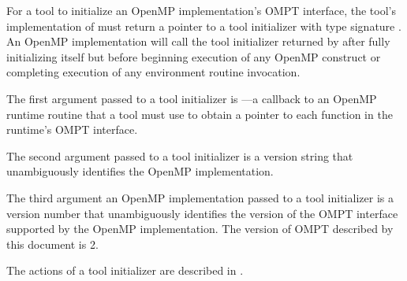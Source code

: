 \descr
For a tool to initialize an OpenMP implementation's OMPT interface,
the tool's implementation of  must return a 
pointer to a tool initializer with type signature .
An OpenMP implementation will call the tool initializer returned by
 after fully initializing itself but before 
beginning execution of any OpenMP construct
or completing execution of any environment routine invocation.  

\argdesc
The first argument passed to a tool initializer 
is ---a callback 
to an OpenMP runtime routine that a tool must use to 
obtain a pointer to each function in the runtime's OMPT interface.

\begin{comment}
All functions in the OMPT interface are marked with \code{OMPT\_API}, which
indicates that the only way a tool can obtain bindings for them
is using the \plc{lookup} callback.

The \code{lookup} callback is necessary in the case when an OpenMP runtime 
is dynamically loaded by a shared library. In this case, 
OMPT interface functions provided by the library may 
not be visible to a preloaded tool.
\end{comment}

The second argument passed to a tool initializer 
is a version string that unambiguously identifies the OpenMP implementation.

\begin{comment}
This argument is useful to tool developers trying to debug a statically-linked executable that contains both a tool implementation and an OpenMP implementation.
Knowing exactly what version of an OpenMP implementation is present 
may be helpful when diagnosing a problem, e.g., identifying an old runtime system that may be incompatible with a newer tool.
\end{comment}

The third argument an OpenMP implementation passed to a tool initializer 
is a version number that unambiguously identifies the version of the 
OMPT interface supported by the OpenMP implementation.  
The version of OMPT described by this document is 2.

The actions of a tool initializer are described in .

